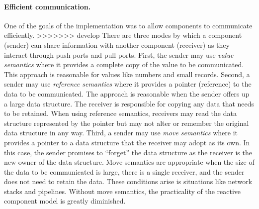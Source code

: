 \paragraph{Efficient communication.}
One of the goals of the implementation was to allow components to communicate efficiently.
>>>>>>> develop
There are three modes by which a component (sender) can share information with another component (receiver) as they interact through push ports and pull ports.
First, the sender may use \emph{value semantics} where it provides a complete copy of the value to be communicated.
This approach is reasonable for values like numbers and small records.
Second, a sender may use \emph{reference semantics} where it provides a pointer (reference) to the data to be communicated.
The approach is reasonable when the sender offers up a large data structure.
The receiver is responsible for copying any data that needs to be retained.
When using reference semantics, receivers may read the data structure represented by the pointer but may not alter or remember the original data structure in any way.
Third, a sender may use \emph{move semantics} where it provides a pointer to a data structure that the receiver may adopt as its own.
In this case, the sender promises to ``forget'' the data structure as the receiver is the new owner of the data structure.
Move semantics are appropriate when the size of the data to be communicated is large, there is a single receiver, and the sender does not need to retain the data.
These conditions arise is situations like network stacks and pipelines.
Without move semantics, the practicality of the reactive component model is greatly diminished.


